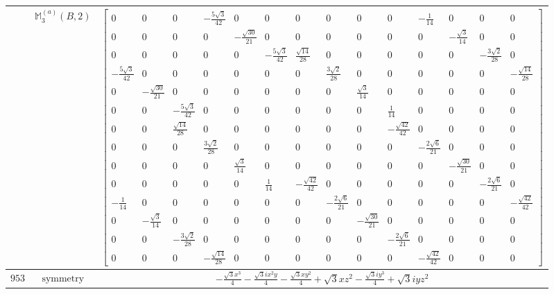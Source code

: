 \documentclass[fleqn,8pt,landscape]{jsarticle}
\begin{document}
\begin{longtable}{ccc}
$  $ & $ \mathbb{M}_{3}^{(a)}(B,2) $ & $ \begin{bmatrix} 0 & 0 & 0 & - \frac{5 \sqrt{3}}{42} & 0 & 0 & 0 & 0 & 0 & 0 & - \frac{1}{14} & 0 & 0 & 0 \\ 0 & 0 & 0 & 0 & - \frac{\sqrt{30}}{21} & 0 & 0 & 0 & 0 & 0 & 0 & - \frac{\sqrt{3}}{14} & 0 & 0 \\ 0 & 0 & 0 & 0 & 0 & - \frac{5 \sqrt{3}}{42} & \frac{\sqrt{14}}{28} & 0 & 0 & 0 & 0 & 0 & - \frac{3 \sqrt{2}}{28} & 0 \\ - \frac{5 \sqrt{3}}{42} & 0 & 0 & 0 & 0 & 0 & 0 & \frac{3 \sqrt{2}}{28} & 0 & 0 & 0 & 0 & 0 & - \frac{\sqrt{14}}{28} \\ 0 & - \frac{\sqrt{30}}{21} & 0 & 0 & 0 & 0 & 0 & 0 & \frac{\sqrt{3}}{14} & 0 & 0 & 0 & 0 & 0 \\ 0 & 0 & - \frac{5 \sqrt{3}}{42} & 0 & 0 & 0 & 0 & 0 & 0 & \frac{1}{14} & 0 & 0 & 0 & 0 \\ 0 & 0 & \frac{\sqrt{14}}{28} & 0 & 0 & 0 & 0 & 0 & 0 & - \frac{\sqrt{42}}{42} & 0 & 0 & 0 & 0 \\ 0 & 0 & 0 & \frac{3 \sqrt{2}}{28} & 0 & 0 & 0 & 0 & 0 & 0 & - \frac{2 \sqrt{6}}{21} & 0 & 0 & 0 \\ 0 & 0 & 0 & 0 & \frac{\sqrt{3}}{14} & 0 & 0 & 0 & 0 & 0 & 0 & - \frac{\sqrt{30}}{21} & 0 & 0 \\ 0 & 0 & 0 & 0 & 0 & \frac{1}{14} & - \frac{\sqrt{42}}{42} & 0 & 0 & 0 & 0 & 0 & - \frac{2 \sqrt{6}}{21} & 0 \\ - \frac{1}{14} & 0 & 0 & 0 & 0 & 0 & 0 & - \frac{2 \sqrt{6}}{21} & 0 & 0 & 0 & 0 & 0 & - \frac{\sqrt{42}}{42} \\ 0 & - \frac{\sqrt{3}}{14} & 0 & 0 & 0 & 0 & 0 & 0 & - \frac{\sqrt{30}}{21} & 0 & 0 & 0 & 0 & 0 \\ 0 & 0 & - \frac{3 \sqrt{2}}{28} & 0 & 0 & 0 & 0 & 0 & 0 & - \frac{2 \sqrt{6}}{21} & 0 & 0 & 0 & 0 \\ 0 & 0 & 0 & - \frac{\sqrt{14}}{28} & 0 & 0 & 0 & 0 & 0 & 0 & - \frac{\sqrt{42}}{42} & 0 & 0 & 0 \end{bmatrix} $ \\ \hline
$ 953 $ & $ \text{symmetry} $ & $ - \frac{\sqrt{3} x^{3}}{4} - \frac{\sqrt{3} i x^{2} y}{4} - \frac{\sqrt{3} x y^{2}}{4} + \sqrt{3} x z^{2} - \frac{\sqrt{3} i y^{3}}{4} + \sqrt{3} i y z^{2} $ \\

\end{longtable}
\end{document}
